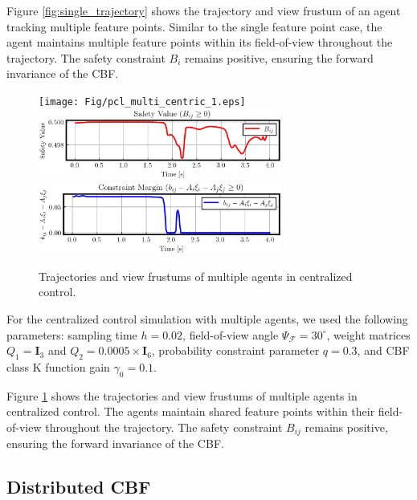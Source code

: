 \documentclass[fleqn,10pt,twocolumn]{SICE_FES25}
\theoremstyle{definition}
\theoremstyle{plain}
\begin{document}
Figure \ref{fig:single_trajectory} shows the trajectory and view frustum of an agent tracking multiple feature points. Similar to the single feature point case, the agent maintains multiple feature points within its field-of-view throughout the trajectory. The safety constraint $B_i$ remains positive, ensuring the forward invariance of the CBF.

\begin{figure}[h]
\begin{center}
\texttt{[image: Fig/pcl\_multi\_centric\_1.eps]}\\
\includegraphics[width=8.0cm]{Fig/pcl_multi_centric_2.eps}\\
\includegraphics[width=8.0cm]{Fig/pcl_multi_centric_3.eps}
\caption{\label{fig:centralized_trajectory} Trajectories and view frustums of multiple agents in centralized control.}
\vspace{-4mm}
\end{center}
\end{figure}

For the centralized control simulation with multiple agents, we used the following parameters: sampling time $h = 0.02$, field-of-view angle $\Psi_{\mathcal{F}} = 30^{\circ}$, weight matrices $Q_1 = {\mathbf{I}}_3$ and $Q_2 = 0.0005 \times {\mathbf{I}}_6$, probability constraint parameter $q = 0.3$, and CBF class K function gain $\gamma_0 = 0.1$.

Figure \ref{fig:centralized_trajectory} shows the trajectories and view frustums of multiple agents in centralized control. The agents maintain shared feature points within their field-of-view throughout the trajectory. The safety constraint $B_{ij}$ remains positive, ensuring the forward invariance of the CBF.

\subsection{Distributed CBF}
\end{document}

